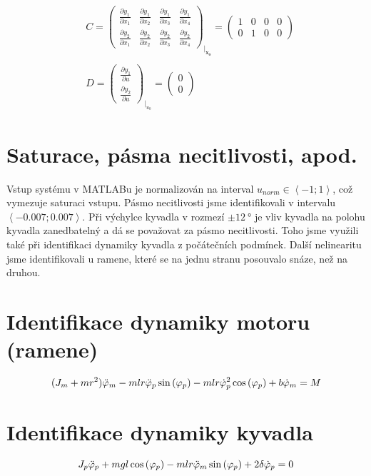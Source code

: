 \documentclass[11pt,a4paper]{article}
\begin{document}
{\begin{align*}
&C =
\begin{pmatrix}
\frac{\partial y_1}{\partial x_1} & \frac{\partial y_1}{\partial x_2} & \frac{\partial y_1}{\partial x_3} & \frac{\partial y_1}{\partial x_4}	\\
\frac{\partial y_2}{\partial x_1} & \frac{\partial y_2}{\partial x_2} & \frac{\partial y_2}{\partial x_3} & \frac{\partial y_2}{\partial x_4}
\end{pmatrix}_{\biggr\rvert_\mathbf{x_0}} =
\left(\begin{array}{cccc} 1 & 0 & 0 & 0\\ 0 & 1 & 0 & 0 \end{array}\right)	\\ \\
&D =
\begin{pmatrix}
\frac{\partial y_1}{\partial u}	\\
\frac{\partial y_2}{\partial u}
\end{pmatrix}_{\biggr\rvert_{u_0}} =
\left(\begin{array}{c} 0\\ 0 \end{array}\right)
\end{align*}
}

\newpage
\section{Saturace, pásma necitlivosti, apod.}
Vstup systému v MATLABu je normalizován na interval $u_{norm} \in \left<-1; 1\right>$, což vymezuje saturaci vstupu. Pásmo necitlivosti jsme identifikovali v intervalu $\left<-0.007; 0.007\right>$.
\newline
\newline
Při výchylce kyvadla v rozmezí $\pm \SI{12}{\degree}$ je vliv kyvadla na polohu kyvadla zanedbatelný a dá se považovat za pásmo necitlivosti. Toho jsme využili také při identifikaci dynamiky kyvadla z počátečních podmínek.
\newline
\newline
Další nelinearitu jsme identifikovali u ramene, které se na jednu stranu posouvalo snáze, než na druhou.

\section{Identifikace dynamiky motoru (ramene)}
$$
(J_m + m r^2) \phidd{m} - m l r \phidd{p}  \sinn{\phin{p}} - m l r \phid{p}^2 \coss{\phin{p}} + b \phid{m} = \M
$$

\section{Identifikace dynamiky kyvadla}
$$
J_p \phidd{p} + m g l \coss{\phin{p}} - m l r \phidd{m} \sinn{\phin{p}} + 2 \delta \phid{p} = 0
$$
\end{document}
